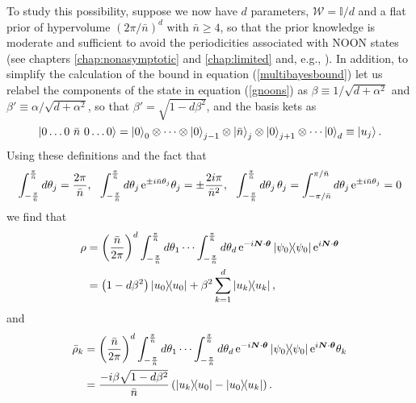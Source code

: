 To study this possibility, suppose we now have $d$ parameters, $\mathcal{W} = \mathbb{I}/d$ and a flat prior of hypervolume $(2\pi/\bar{n})^d$ with $\bar{n} \geqslant 4$, so that the prior knowledge is moderate and sufficient to avoid the periodicities associated with NOON states (see chapters \ref{chap:nonasymptotic} and \ref{chap:limited} and, e.g., \cite{alfredo2017, hall2012, friis2017}). In addition, to simplify the calculation of the bound in equation (\ref{multibayesbound}) let us relabel the components of the state in equation (\ref{gnoons}) as $\beta \equiv 1/\sqrt{d+\alpha^2}$ and $\beta' \equiv \alpha/\sqrt{d+\alpha^2}$, so that $\beta' = \sqrt{1-d\beta^2}$, and the basis kets as
\begin{equation}
\ket{0\dots 0~\bar{n}~0 \dots 0} = \ket{0}_0 \otimes \cdots \otimes \ket{0}_{j-1} \otimes \ket{\bar{n}}_j \otimes \ket{0}_{j+1}\otimes \cdots \ket{0}_d \equiv \ket{u_j}.
\end{equation}
Using these definitions and the fact that
\begin{equation}
\int_{-\frac{\pi}{\bar{n}}}^{\frac{\pi}{\bar{n}}} d\theta_j = \frac{2\pi}{\bar{n}},~~\int_{-\frac{\pi}{\bar{n}}}^{\frac{\pi}{\bar{n}}} d\theta_j \hspace{0.15em} \mathrm{e}^{\pm i \bar{n}\theta_j} \theta_j = \pm \frac{2i \pi}{\bar{n}^2} ,~~\int_{-\frac{\pi}{\bar{n}}}^{\frac{\pi}{\bar{n}}} d\theta_j\hspace{0.15em} \theta_j = \int_{-\pi/\bar{n}}^{\pi/\bar{n}} d\theta_j \hspace{0.15em} \mathrm{e}^{\pm i \bar{n}\theta_j} = 0
\end{equation}
we find that
\begin{align}
\rho &= \left(\frac{\bar{n}}{2\pi}\right)^d \int_{-\frac{\pi}{\bar{n}}}^{\frac{\pi}{\bar{n}}} d\theta_1 \cdots \int_{-\frac{\pi}{\bar{n}}}^{\frac{\pi}{\bar{n}}} d\theta_d \hspace{0.15em}\mathrm{e}^{-i \boldsymbol{N}\cdot\boldsymbol{\theta}} \ketbra{\psi_0}\mathrm{e}^{i \boldsymbol{N}\cdot\boldsymbol{\theta}}
\nonumber \\
&= \left(1 - d\beta^2\right)\ketbra{u_0} + \beta^2 \sum_{k=1}^d \ketbra{u_k},
\label{labeleffstatenoon}
\end{align}
and
\begin{align}
\bar{\rho}_k &= \left(\frac{\bar{n}}{2\pi}\right)^d \int_{-\frac{\pi}{\bar{n}}}^{\frac{\pi}{\bar{n}}} d\theta_1 \cdots \int_{-\frac{\pi}{\bar{n}}}^{\frac{\pi}{\bar{n}}} d\theta_d \hspace{0.15em} \mathrm{e}^{-i \boldsymbol{N}\cdot\boldsymbol{\theta}} \ketbra{\psi_0}\mathrm{e}^{i \boldsymbol{N}\cdot\boldsymbol{\theta}}\theta_k
\nonumber \\
&= \frac{-i\beta \sqrt{1-d\beta^2}}{\bar{n}} \left(\ketbra{u_k}{u_0} - \ketbra{u_0}{u_k}\right).
\end{align}

